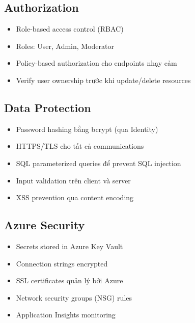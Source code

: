 \subsection{Authorization}
\begin{itemize}
    \item Role-based access control (RBAC)
    \item Roles: User, Admin, Moderator
    \item Policy-based authorization cho endpoints nhạy cảm
    \item Verify user ownership trước khi update/delete resources
\end{itemize}

\subsection{Data Protection}
\begin{itemize}
    \item Password hashing bằng bcrypt (qua Identity)
    \item HTTPS/TLS cho tất cả communications
    \item SQL parameterized queries để prevent SQL injection
    \item Input validation trên client và server
    \item XSS prevention qua content encoding
\end{itemize}

\subsection{Azure Security}
\begin{itemize}
    \item Secrets stored in Azure Key Vault
    \item Connection strings encrypted
    \item SSL certificates quản lý bởi Azure
    \item Network security groups (NSG) rules
    \item Application Insights monitoring
\end{itemize}
